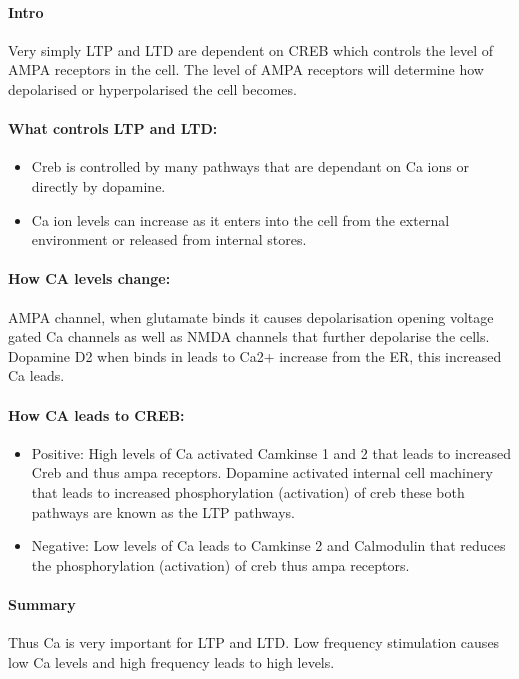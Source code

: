 \documentclass[main]{subfiles}
\begin{document}
\paragraph{Intro}
Very simply LTP and LTD are dependent on CREB which controls the level of AMPA receptors in the cell. The level of AMPA receptors will determine how depolarised or hyperpolarised the cell becomes. 

\paragraph{What controls LTP and LTD:}
\begin{itemize}
    \item Creb is controlled by many pathways that are dependant on Ca ions or directly by dopamine. 
    \item Ca ion levels can increase as it enters into the cell from the external environment or released from internal stores.
\end{itemize}

\paragraph{How CA levels change:}
AMPA channel, when glutamate binds it causes depolarisation opening voltage gated Ca channels as well as NMDA channels that further depolarise the cells. 
Dopamine D2 when binds in leads to Ca2+ increase from the ER, this increased Ca leads. 

\paragraph{How CA leads to CREB:}
\begin{itemize}
    \item Positive: High levels of Ca activated Camkinse 1 and 2 that leads to increased Creb and thus ampa receptors. Dopamine activated internal cell machinery that leads to increased phosphorylation (activation) of creb these both pathways are known as the LTP pathways. 
    \item Negative: Low levels of Ca leads to Camkinse 2 and Calmodulin that reduces the phosphorylation (activation) of creb thus ampa receptors.
\end{itemize}

\paragraph{Summary}
Thus Ca is very important for LTP and LTD. Low frequency stimulation causes low Ca levels and high frequency leads to high levels.
\end{document}
